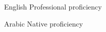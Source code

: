 
\begin{cvskills}

  \cvskill
    {English} %
    {Professional proficiency} %

  \cvskill
    {Arabic} %
    {Native proficiency} %

\end{cvskills}
